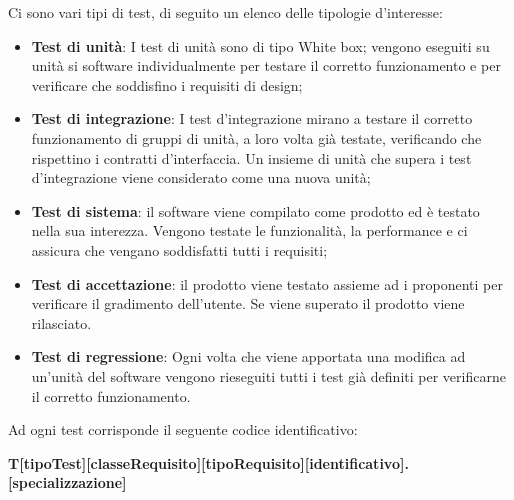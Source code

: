 	Ci sono vari tipi di test, di seguito un elenco delle tipologie d'interesse:
	\begin{itemize}
	    \item \textbf{Test di unità}: I test di unità sono di tipo White box; vengono eseguiti su unità si software individualmente per testare il corretto funzionamento e per verificare che soddisfino i requisiti di design;
	    \item \textbf{Test di integrazione}: I test d'integrazione mirano a testare il corretto funzionamento di gruppi di unità, a loro volta già testate, verificando che rispettino i contratti d'interfaccia. Un insieme di unità che supera i test d'integrazione viene considerato come una nuova unità;
	    \item \textbf{Test di sistema}: il software viene compilato come prodotto ed è testato nella sua interezza. Vengono testate le funzionalità, la performance e ci assicura che vengano soddisfatti tutti i requisiti;
	    \item \textbf{Test di accettazione}: il prodotto viene testato assieme ad i proponenti per verificare il gradimento dell'utente. Se viene superato il prodotto viene rilasciato.
	    \item \textbf{Test di regressione}: Ogni volta che viene apportata una modifica ad un'unità del software vengono rieseguiti tutti i test già definiti per verificarne il corretto funzionamento.
	\end{itemize}
	Ad ogni test corrisponde il seguente codice identificativo:\\
	
	\centerline{\textbf{T[tipoTest][classeRequisito][tipoRequisito][identificativo].[specializzazione]}}
	
